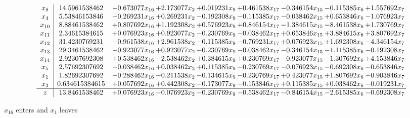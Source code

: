\documentclass[10pt]{article}
\begin{document}
 \[\begin{array}{c| c c@{\hskip 2pt} c@{\hskip 2pt} c@{\hskip 2pt} c@{\hskip 2pt} c@{\hskip 2pt} c@{\hskip 2pt} c@{\hskip 2pt} }
 x_{8}   &  14.5961538462 & -0.673077 x_{16} & + 2.173077 x_{2} & + 0.019231 x_{9} & + 0.461538 x_{17} & -0.346154 x_{15} & -0.115385 x_{6} & + 1.557692 x_{7}\\
 x_{4}   &  5.53846153846 & -0.269231 x_{16} & + 0.269231 x_{2} & -0.192308 x_{9} & -0.115385 x_{17} & -0.038462 x_{15} & + 0.653846 x_{6} & -1.076923 x_{7}\\
 x_{10}   &  8.88461538462 & + 0.807692 x_{16} & + 1.192308 x_{2} & + 0.576923 x_{9} & + 0.846154 x_{17} & -1.384615 x_{15} & -8.461538 x_{6} & + 1.730769 x_{7}\\
 x_{11}   &  2.34615384615 & + 0.076923 x_{16} & + 0.923077 x_{2} & -0.230769 x_{9} & -0.038462 x_{17} & + 0.653846 x_{15} & + 3.884615 x_{6} & + 3.807692 x_{7}\\
 x_{12}   &  31.4230769231 & -0.961538 x_{16} & + 2.961538 x_{2} & -0.115385 x_{9} & -0.769231 x_{17} & + 0.076923 x_{15} & + 1.692308 x_{6} & -4.346154 x_{7}\\
 x_{13}   &  29.3461538462 & -0.923077 x_{16} & + 0.923077 x_{2} & -0.230769 x_{9} & -0.038462 x_{17} & -0.346154 x_{15} & -1.115385 x_{6} & -0.192308 x_{7}\\
 x_{14}   &  2.92307692308 & + 0.538462 x_{16} & -2.538462 x_{2} & + 0.384615 x_{9} & + 0.230769 x_{17} & -0.923077 x_{15} & -1.307692 x_{6} & + 4.153846 x_{7}\\
 x_{5}   &  2.57692307692 & -0.038462 x_{16} & + 0.038462 x_{2} & + 0.115385 x_{9} & -0.230769 x_{17} & -0.076923 x_{15} & -0.692308 x_{6} & -0.653846 x_{7}\\
 x_{1}   &  1.82692307692 & -0.288462 x_{16} & -0.211538 x_{2} & -0.134615 x_{9} & -0.230769 x_{17} & + 0.423077 x_{15} & + 1.807692 x_{6} & -0.903846 x_{7}\\
 x_{3}   &  0.634615384615 & + 0.057692 x_{16} & + 0.442308 x_{2} & -0.173077 x_{9} & -0.153846 x_{17} & + 0.115385 x_{15} & + 0.038462 x_{6} & -0.019231 x_{7}\\
\hline
z    &  13.8461538462 & + 0.076923 x_{16} & -0.076923 x_{2} & -0.230769 x_{9} & -0.538462 x_{17} & -0.846154 x_{15} & -2.615385 x_{6} & -0.692308 x_{7}\\
\end{array}\]


 $ x_{16} $ enters and $ x_{1} $ leaves 
\end{document}
